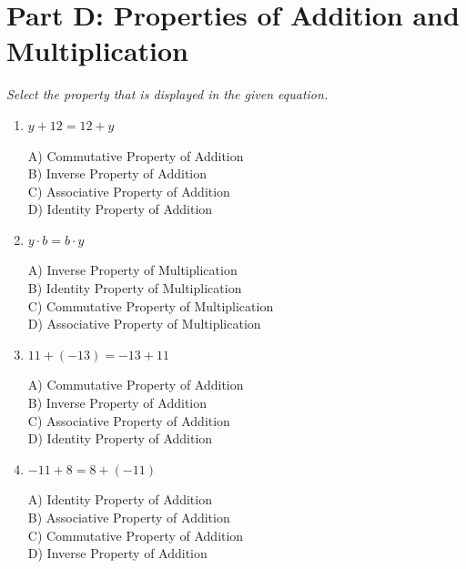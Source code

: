 \documentclass[11pt]{article}
\begin{document}
\section*{Part D: Properties of Addition and Multiplication}
\noindent\textit{Select the property that is displayed in the given equation.}
\begin{enumerate}
  \item $y + 12 = 12 + y$
\\[2pt]
\begin{minipage}{\linewidth}
A) Commutative Property of Addition \\
B) Inverse Property of Addition \\
C) Associative Property of Addition \\
D) Identity Property of Addition
\end{minipage}
  \vspace{0.3cm}
  \item $y \cdot b = b \cdot y$
\\[2pt]
\begin{minipage}{\linewidth}
A) Inverse Property of Multiplication \\
B) Identity Property of Multiplication \\
C) Commutative Property of Multiplication \\
D) Associative Property of Multiplication
\end{minipage}
  \vspace{0.3cm}
  \item $11 + (-13) = -13 + 11$
\\[2pt]
\begin{minipage}{\linewidth}
A) Commutative Property of Addition \\
B) Inverse Property of Addition \\
C) Associative Property of Addition \\
D) Identity Property of Addition
\end{minipage}
  \vspace{0.3cm}
  \item $-11 + 8 = 8 + (-11)$
\\[2pt]
\begin{minipage}{\linewidth}
A) Identity Property of Addition \\
B) Associative Property of Addition \\
C) Commutative Property of Addition \\
D) Inverse Property of Addition
\end{minipage}
  \vspace{0.3cm}

\end{enumerate}
\end{document}
